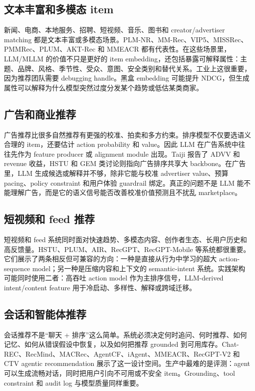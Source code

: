 \documentclass[UTF8,fontset=fandol,11pt]{ctexart}
\begin{document}
\subsection{文本丰富和多模态 item}

新闻、电商、本地服务、招聘、短视频、音乐、图书和 creator/advertiser matching 都是文本丰富或多模态场景。PLM-NR、MM-Rec、VIP5、MISSRec、PMMRec、PLUM、AKT-Rec 和 MMEACR 都有代表性。在这些场景里，LLM/MLLM 的价值不只是更好的 item embedding，还包括暴露可解释属性：主题、品牌、风格、季节性、受众、意图、安全类别和替代关系。工业上这很重要，因为推荐团队需要 debugging handle。黑盒 embedding 可能提升 NDCG，但生成属性可以解释为什么模型突然过度分发某个趋势或低估某类商家。

\subsection{广告和商业推荐}

广告推荐比很多自然推荐有更强的校准、拍卖和多方约束。排序模型不仅要选语义合理的 item，还要估计 action probability 和 value。因此 LLM 在广告系统中往往先作为 feature producer 或 alignment module 出现。Taiji 报告了 ADVV 和 revenue 收益，HSTU 和 GEM 类讨论则指向广告排序共享大 backbone。在广告里，LLM 生成候选或解释并不够，除非它能与校准 advertiser value、预算 pacing、policy constraint 和用户体验 guardrail 绑定。真正的问题不是 LLM 能不能理解广告，而是它的语义信号能否改善校准价值预测且不扰乱 marketplace。

\subsection{短视频和 feed 推荐}

短视频和 feed 系统同时面对快速趋势、多模态内容、创作者生态、长用户历史和高反馈量。HSTU、PLUM、AIR、RecGPT、RecGPT-Mobile 等系统都很重要。它们展示了两条相反但可兼容的方向：一种是直接从行为中学习的超大 action-sequence model；另一种是压缩内容和上下文的 semantic-intent 系统。实践架构可能同时使用二者：高吞吐 action model 作为主排序信号，LLM-derived intent/content feature 用于冷启动、多样性、解释或跨域迁移。

\subsection{会话和智能体推荐}

会话推荐不是“聊天 + 排序”这么简单。系统必须决定何时追问、何时推荐、如何记忆、如何从错误假设中恢复，以及如何把推荐 grounded 到可用库存。Chat-REC、RecMind、MACRec、AgentCF、iAgent、MMEACR、RecGPT-V2 和 CTV agentic recommendation 展示了这一设计空间。生产中最难的是评测：agent 可以生成流畅对话，同时把用户引向不可用或不安全 item。Grounding、tool constraint 和 audit log 与模型质量同样重要。
\end{document}

